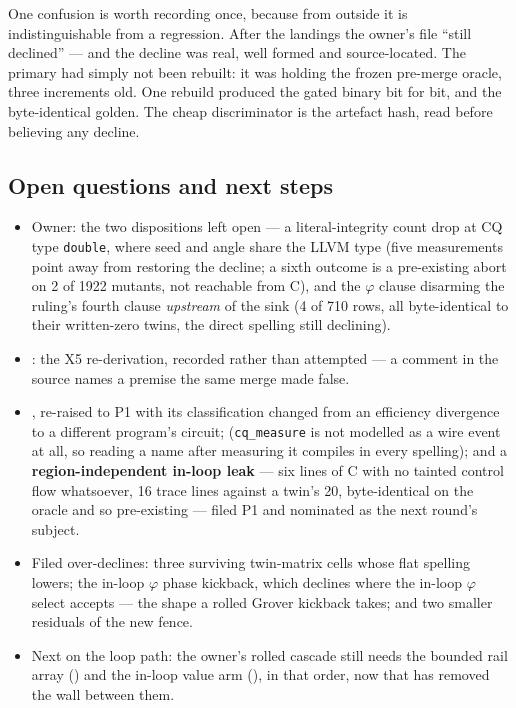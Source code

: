 One confusion is worth recording once, because from outside it is indistinguishable from a regression. After
the landings the owner's file ``still declined'' --- and the decline was real, well formed and
source-located. The primary  had simply not been rebuilt: it was holding the frozen pre-merge
oracle, three increments old. One rebuild produced the gated binary bit for bit, and the byte-identical
golden. The cheap discriminator is the artefact hash, read before believing any decline.

\subsection*{Open questions and next steps}
\begin{itemize}
  \item Owner: the two  dispositions left open --- a literal-integrity count drop at CQ type
    \texttt{double}, where seed and angle share the LLVM type (five measurements point away from restoring
    the decline; a sixth outcome is a pre-existing abort on 2 of 1922 mutants, not reachable from C), and
    the \(\varphi\) clause disarming the ruling's fourth clause \emph{upstream} of the sink (4 of 710 rows,
    all byte-identical to their written-zero twins, the direct spelling still declining).
  \item {}: the X5 re-derivation, recorded rather than attempted --- a comment in the source
    names a premise the same merge made false.
  \item {}, re-raised to P1 with its classification changed from an efficiency divergence to a
    different program's circuit;  (\texttt{cq\_measure} is not modelled as a wire event at all, so
    reading a name after measuring it compiles in every spelling); and a \textbf{region-independent in-loop
    leak} --- six lines of C with no tainted control flow whatsoever, 16 trace lines against a twin's 20,
    byte-identical on the oracle and so pre-existing --- filed P1 and nominated as the next round's subject.
  \item Filed over-declines: three surviving twin-matrix cells whose flat spelling lowers; the in-loop
    \(\varphi\) phase kickback, which declines where the in-loop \(\varphi\) select accepts --- the shape a
    rolled Grover kickback takes; and two smaller residuals of the new fence.
  \item Next on the loop path: the owner's rolled cascade still needs the bounded rail array () and
    the in-loop value arm (), in that order, now that  has removed the wall between them.
\end{itemize}

